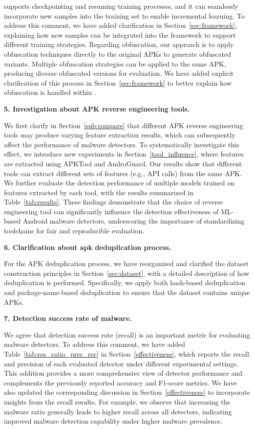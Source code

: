 \codename supports checkpointing and resuming training processes, and it can seamlessly incorporate new samples into the training set to enable incremental learning. To address this comment, we have added clarification in Section~\ref{sec:framework}, explaining how new samples can be integrated into the framework to support different training strategies.
Regarding obfuscation, our approach is to apply obfuscation techniques directly to the original APKs to generate obfuscated variants. Multiple obfuscation strategies can be applied to the same APK, producing diverse obfuscated versions for evaluation. We have added explicit clarification of this process in Section~\ref{sec:framework} to better explain how obfuscation is handled within \codename.

\newpage
\noindent \textbf{5. Investigation about APK reverse engineering tools.}

We first clarify in Section~\ref{sub:compare} that different APK reverse engineering tools may produce varying feature extraction results, which can subsequently affect the performance of malware detectors. To systematically investigate this effect, we introduce new experiments in Section~\ref{tool_influence}, where features are extracted using APKTool and AndroGuard.
Our results show that different tools can extract different sets of features (e.g., API calls) from the same APK. We further evaluate the detection performance of multiple models trained on features extracted by each tool, with the results summarized in Table~\ref{tab:results}. These findings demonstrate that the choice of reverse engineering tool can significantly influence the detection effectiveness of ML-based Android malware detectors, underscoring the importance of standardizing toolchains for fair and reproducible evaluation.

\vspace{0.1cm}
\noindent \textbf{6. Clarification about apk deduplication process.}

For the APK deduplication process, we have reorganized and clarified the dataset construction principles in Section~\ref{sec:dataset}, with a detailed description of how deduplication is performed. Specifically, we apply both hash-based deduplication and package-name-based deduplication to ensure that the dataset contains unique APKs. 

\vspace{0.1cm}
\noindent \textbf{7. Detection success rate of malware.}

We agree that detection success rate (recall) is an important metric for evaluating malware detectors. To address this comment, we have added Table~\ref{tab:res_ratio_prec_rec} in Section~\ref{effectiveness}, which reports the recall and precision of each evaluated detector under different experimental settings. This addition provides a more comprehensive view of detector performance and complements the previously reported accuracy and F1-score metrics.
We have also updated the corresponding discussion in Section~\ref{effectiveness} to incorporate insights from the recall results. For example, we observe that increasing the malware ratio generally leads to higher recall across all detectors, indicating improved malware detection capability under higher malware prevalence.

